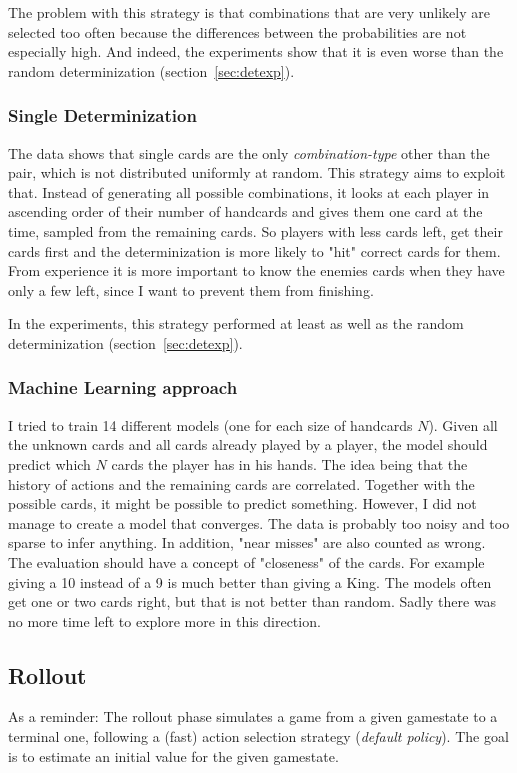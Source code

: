 The problem with this strategy is that combinations that are very unlikely are selected too often because the differences between the probabilities are not especially high. And indeed, the experiments show that it is even worse than the random determinization (section~\ref{sec:detexp}).


\subsubsection{Single Determinization}
The data shows that single cards are the only \textit{combination-type} other than the pair, which is not distributed uniformly at random.
This strategy aims to exploit that. Instead of generating all possible combinations, it looks at each player in ascending order of their number of handcards and gives them one card at the time, sampled from the remaining cards.\newline
So players with less cards left, get their cards first and the determinization is more likely to "hit" correct cards for them. From experience it is more important to know the enemies cards when they have only a few left, since I want to prevent them from finishing.

In the experiments, this strategy performed at least as well as the random determinization (section~\ref{sec:detexp}).


\subsubsection{Machine Learning approach}
I tried to train 14 different models (one for each size of handcards $N$). Given all the unknown cards and all cards already played by a player, the model should predict which $N$ cards the player has in his hands.
The idea being that the history of actions and the remaining cards are correlated. Together with the possible cards, it might be possible to predict something.
However, I did not manage to create a model that converges. The data is probably too noisy and too sparse to infer anything. In addition, "near misses" are also counted as wrong. The evaluation should have a concept of "closeness" of the cards. For example giving a 10 instead of a 9 is much better than giving a King. The models often get one or two cards right, but that is not better than random.\newline
Sadly there was no more time left to explore more in this direction.


\subsection{Rollout}
\label{sec:rollout}
As a reminder: The rollout phase simulates a game from a given gamestate to a terminal one, following a (fast) action selection strategy (\textit{default policy}). The goal is to estimate an initial value for the given gamestate.

